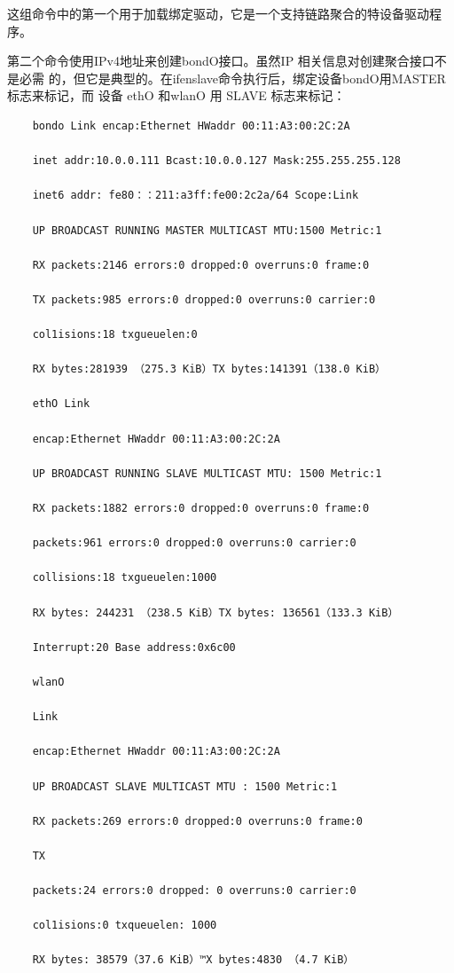 这组命令中的第一个用于加载绑定驱动，它是一个支持链路聚合的特设备驱动程序。

第二个命令使用IPv4地址来创建bondO接口。虽然IP 相关信息对创建聚合接口不是必需
的，但它是典型的。在ifenslave命令执行后，绑定设备bondO用MASTER 标志来标记，而
设备 ethO 和wlanO 用 SLAVE 标志来标记：
\begin{verbatim}
    bondo Link encap:Ethernet HWaddr 00:11:A3:00:2C:2A
    
    inet addr:10.0.0.111 Bcast:10.0.0.127 Mask:255.255.255.128
    
    inet6 addr: fe80：：211:a3ff:fe00:2c2a/64 Scope:Link
    
    UP BROADCAST RUNNING MASTER MULTICAST MTU:1500 Metric:1
    
    RX packets:2146 errors:0 dropped:0 overruns:0 frame:0
    
    TX packets:985 errors:0 dropped:0 overruns:0 carrier:0
    
    col1isions:18 txgueuelen:0
    
    RX bytes:281939 （275.3 KiB）TX bytes:141391（138.0 KiB）
    
    ethO Link
    
    encap:Ethernet HWaddr 00:11:A3:00:2C:2A
    
    UP BROADCAST RUNNING SLAVE MULTICAST MTU: 1500 Metric:1
    
    RX packets:1882 errors:0 dropped:0 overruns:0 frame:0
    
    packets:961 errors:0 dropped:0 overruns:0 carrier:0
    
    collisions:18 txgueuelen:1000
    
    RX bytes: 244231 （238.5 KiB）TX bytes: 136561（133.3 KiB）
    
    Interrupt:20 Base address:0x6c00
    
    wlanO
    
    Link
    
    encap:Ethernet HWaddr 00:11:A3:00:2C:2A
    
    UP BROADCAST SLAVE MULTICAST MTU : 1500 Metric:1
    
    RX packets:269 errors:0 dropped:0 overruns:0 frame:0
    
    TX
    
    packets:24 errors:0 dropped: 0 overruns:0 carrier:0
    
    col1isions:0 txqueuelen: 1000
    
    RX bytes: 38579（37.6 KiB）™X bytes:4830 （4.7 KiB）
\end{verbatim}


